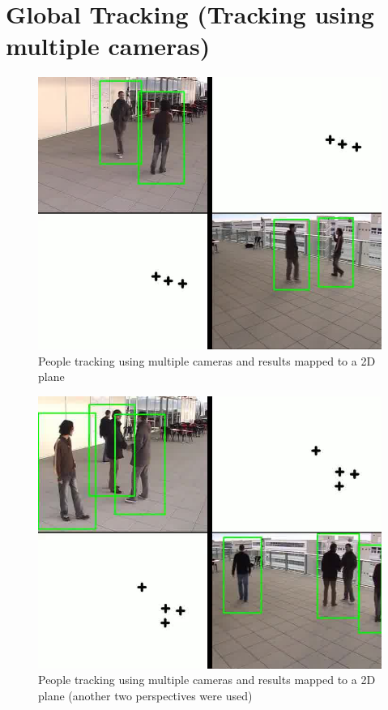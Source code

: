 \documentclass[12pt,a4paper]{report}
\begin{document}
\section{Global Tracking (Tracking using multiple cameras)}

 \begin{figure}[H]
\includegraphics[width=12cm]{mul_cam1.jpg}
\centering
\caption{People tracking using multiple cameras and results mapped to a 2D plane}
\label{mul_cam1}
\end{figure}
 \begin{figure}[H]
\includegraphics[width=12cm]{mul_cam2.jpg}
\centering
\caption{People tracking using multiple cameras and results mapped to a 2D plane (another two perspectives were used)}
\label{mul_cam2}
\end{figure}
\end{document}
